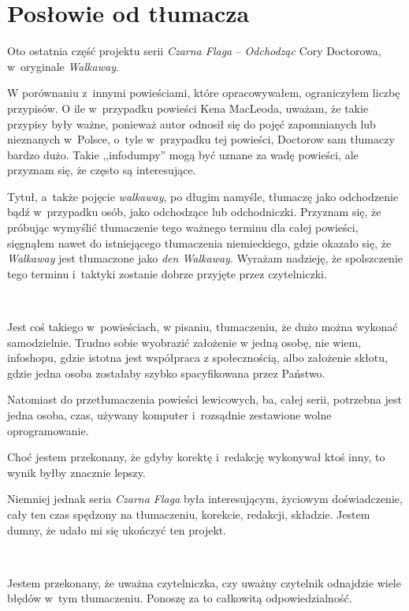 \documentclass[oneside,polish,11pt,sfheadings]{mwbk}
\begin{document}
\chapter*{Posłowie od tłumacza}

Oto ostatnia część projektu serii \textit{Czarna Flaga} -- \textit{Odchodząc} Cory Doctorowa, w~oryginale \textit{Walkaway}.

W porównaniu z~innymi powieściami, które opracowywałem, ograniczyłem liczbę przypisów. O ile w~przypadku powieści Kena MacLeoda, uważam, że takie przypisy były ważne, ponieważ autor odnosił się do pojęć zapomnianych lub nieznanych w~Polsce, o~tyle w~przypadku tej powieści, Doctorow sam tłumaczy bardzo dużo. Takie ,,infodumpy'' mogą być uznane za wadę powieści, ale przyznam się, że często są interesujące. 

Tytuł, a~także pojęcie \textit{walkaway}, po długim namyśle, tłumaczę jako odchodzenie bądź w~przypadku osób, jako odchodzące lub odchodniczki. Przyznam się, że próbując wymyślić tłumaczenie tego ważnego terminu dla całej powieści, sięgnąłem nawet do istniejącego tłumaczenia niemieckiego, gdzie okazało się, że \textit{Walkaway} jest tłumaczone jako \textit{den Walkaway}. Wyrażam nadzieję, że spolszczenie tego terminu i~taktyki zostanie dobrze przyjęte przez czytelniczki.

~

Jest coś takiego w~powieściach, w pisaniu, tłumaczeniu, że dużo można wykonać samodzielnie. Trudno sobie wyobrazić założenie w jedną osobę, nie wiem, infoshopu, gdzie istotna jest współpraca z społecznością, albo założenie skłotu, gdzie jedna osoba zostałaby szybko spacyfikowana przez Państwo.

Natomiast do przetłumaczenia powieści lewicowych, ba, całej serii, potrzebna jest jedna osoba, czas, używany komputer i~rozsądnie zestawione wolne oprogramowanie. 

Choć jestem przekonany, że gdyby korektę i~redakcję wykonywał ktoś inny, to wynik byłby znacznie lepszy.

Niemniej jednak seria \textit{Czarna Flaga} była interesującym, życiowym doświadczenie, cały ten czas spędzony na tłumaczeniu, korekcie, redakcji, składzie. Jestem dumny, że udało mi się ukończyć ten projekt.

~

Jestem przekonany, że uważna czytelniczka, czy uważny czytelnik odnajdzie wiele błędów w~tym tłumaczeniu. Ponoszę za to całkowitą odpowiedzialność.\\
\end{document}
